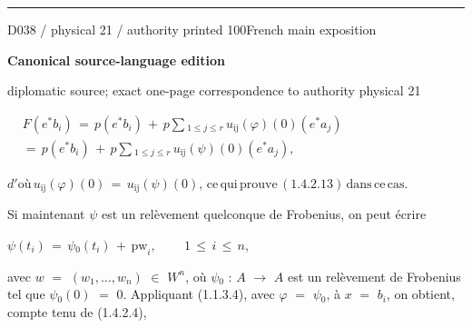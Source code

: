 \documentclass[9pt]{article}
\newcommand{\CanonText}[1]{\par{\fontsize{8.0}{9.35}\selectfont\RaggedRight #1\par}\vspace{2.2pt}}
\newcommand{\CanonDisplay}[1]{\par\vspace{1.2pt}\begin{center}{\fontsize{7.2}{8.4}\selectfont\(\displaystyle #1\)}\end{center}\vspace{1.2pt}}
\newenvironment{CanonMathBlock}{\par\vspace{1.2pt}\begin{center}\fontsize{6.8}{8.0}\selectfont\(\displaystyle}{\)\end{center}\vspace{1.2pt}}
\newcommand{\LayerTitle}{Canonical source-language edition}
\begin{document}
\begin{minipage}[t][\dimexpr\textheight-5pt\relax][t]{\textwidth}
\vfill
{\color{Accent}\hrule height 0.35pt}\vspace{3pt}
\end{minipage}
\newpage
\noindent\begin{minipage}[t][\dimexpr\textheight-5pt\relax][t]{\textwidth}
{\sffamily\fontsize{7.3}{8.2}\selectfont\color{Quiet} D038 / physical 21 / authority printed 100\hfill French main exposition}
\par{}\vspace{4.5pt}
{\sffamily\fontsize{10.4}{11.6}\selectfont\bfseries\color{Accent} \LayerTitle}
\par{\sffamily\fontsize{6.7}{7.7}\selectfont\color{Quiet} diplomatic source; exact one-page correspondence to authority physical 21}
\vspace{5pt}
\begin{CanonMathBlock}
\begin{aligned}
& F(e^{*}b_{i})\,=\,p(e^{*}b_{i})\,+\,p\sum{}_{1\leq{}j\leq{}r}\,u_{\mathrm{ij}}(\varphi{})(0)(e^{*}a_{j})\\
& =\,p(e^{*}b_{i})\,+\,p\sum{}_{1\leq{}j\leq{}r}\,u_{\mathrm{ij}}(\psi{})(0)(e^{*}a_{j}),
\end{aligned}
\end{CanonMathBlock}
\CanonDisplay{d'\text{où}\,u_{\mathrm{ij}}(\varphi{})(0)\,=\,u_{\mathrm{ij}}(\psi{})(0),\,\text{ce}\,\text{qui}\,\text{prouve}\,(1.4.2.13)\,\text{dans}\,\text{ce}\,\text{cas}.}
\CanonText{Si maintenant \(\psi{}\) est un relèvement quelconque de Frobenius, on peut écrire}
\CanonDisplay{\psi{}(t_{i})\,=\,\psi{}_{0}(t_{i})\,+\,\text{pw}_{i},\qquad\,1\,\leq{}\,i\,\leq{}\,n,}
\CanonText{avec \(w\) \(=\) \((w_{1},\ldots{},w_{n})\) \(\in{}\) \(W^{n}\), où \(\psi{}_{0}\) : \(A\) \(\to{}\) \(A\) est un relèvement de Frobenius tel que \(\psi{}_{0}(0)\) \(=\) 0. Appliquant (1.1.3.4), avec \(\varphi{}\) \(=\) \(\psi{}_{0}\), à \(x\) \(=\) \(b_{i}\), on obtient, compte tenu de (1.4.2.4),}

\end{minipage}
\end{document}
